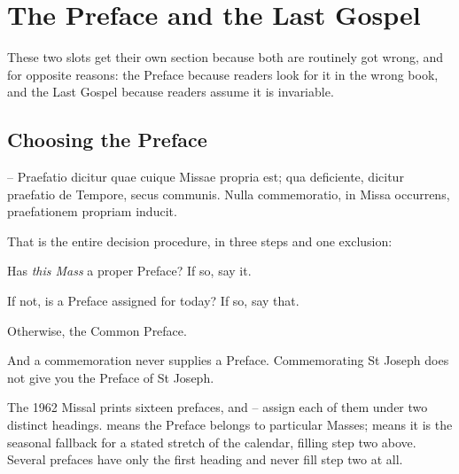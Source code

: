 \section{The Preface and the Last Gospel}

These two slots get their own section because both are routinely got wrong,
and for opposite reasons: the Preface because readers look for it in the wrong
book, and the Last Gospel because readers assume it is invariable.

\subsection{Choosing the Preface}

\begin{rulebox}{--}
Praefatio dicitur quae cuique Missae propria est; qua deficiente, dicitur
praefatio de Tempore, secus communis. Nulla commemoratio, in Missa occurrens,
praefationem propriam inducit.
\end{rulebox}

That is the entire decision procedure, in three steps and one exclusion:

\begin{steps}
\item Has \emph{this Mass} a proper Preface? If so, say it.
\item If not, is a Preface assigned  for today? If
so, say that.
\item Otherwise, the Common Preface.
\end{steps}

\noindent
And a commemoration never supplies a Preface. Commemorating St Joseph does not
give you the Preface of St Joseph.

The 1962 Missal prints sixteen prefaces, and -- assign each
of them under two distinct headings.  means the Preface
belongs to particular Masses;  means it is the
seasonal fallback for a stated stretch of the calendar, filling step two above.
Several prefaces have only the first heading and never fill step two at all.


